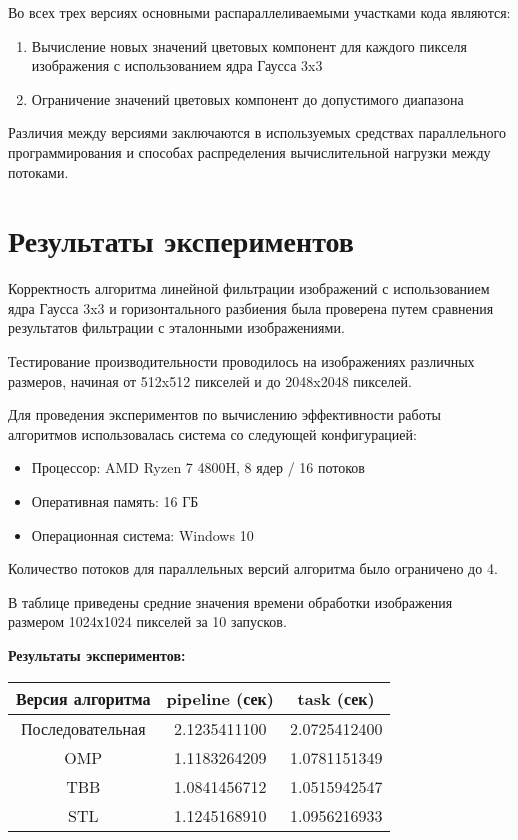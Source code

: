 \documentclass{report}
\begin{document}
Во всех трех версиях основными распараллеливаемыми участками кода являются:
\begin{enumerate}
\item Вычисление новых значений цветовых компонент для каждого пикселя изображения с использованием ядра Гаусса 3x3
\item Ограничение значений цветовых компонент до допустимого диапазона
\end{enumerate}

Различия между версиями заключаются в используемых средствах параллельного программирования и способах распределения вычислительной нагрузки между потоками.

\newpage

\section*{Результаты экспериментов}
\par Корректность алгоритма линейной фильтрации изображений с использованием ядра Гаусса 3x3 и горизонтального разбиения была проверена путем сравнения результатов фильтрации с эталонными изображениями.
\par Тестирование производительности проводилось на изображениях различных размеров, начиная от 512x512 пикселей и до 2048x2048 пикселей.
\par Для проведения экспериментов по вычислению эффективности работы алгоритмов использовалась система со следующей конфигурацией:
\begin{itemize}
\item Процессор: AMD Ryzen 7 4800H, 8 ядер / 16 потоков
\item Оперативная память: 16 ГБ
\item Операционная система: Windows 10
\end{itemize}
\par Количество потоков для параллельных версий алгоритма было ограничено до 4.
\par В таблице приведены средние значения времени обработки изображения размером 1024х1024 пикселей за 10 запусков.
\par \textbf{Результаты экспериментов:}
\begin{center}
\begin{tabular}{ ||c | c | c ||  }
    \hline Версия алгоритма & pipeline (сек) & task (сек)\\ 
    \hline Последовательная & 2.1235411100 & 2.0725412400 \\
    \hline OMP & 1.1183264209 & 1.0781151349 \\
    \hline TBB & 1.0841456712 & 1.0515942547 \\ 
    \hline STL & 1.1245168910 & 1.0956216933 \\ 
    \hline
\end{tabular}\\[5mm]
\end{center}
\end{document}
